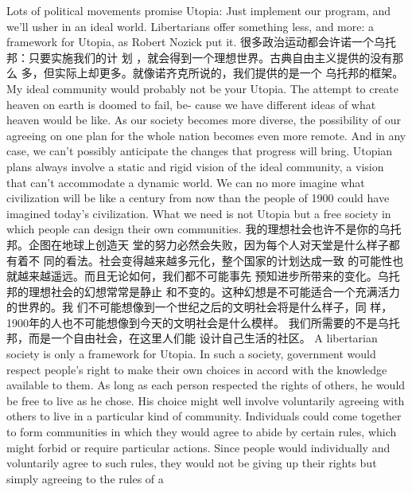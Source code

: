 \begin{paracol}{2}
Lots of political movements promise Utopia: Just implement
our program, and we'll usher in an ideal world. Libertarians
offer something less, and more: a framework for Utopia, as
Robert Nozick put it.
\switchcolumn
很多政治运动都会许诺一个乌托邦：只要实施我们的计
划 ，就会得到一个理想世界。古典自由主义提供的没有那么
多，但实际上却更多。就像诺齐克所说的，我们提供的是一个
乌托邦的框架。
\switchcolumn*
My ideal community would probably not be your Utopia. The attempt to create heaven on earth is doomed to fail, be-
cause we have different ideas of what heaven would be like. As
our society becomes more diverse, the possibility of our agreeing on one plan for the whole nation becomes even more remote. And in any case, we can't possibly anticipate the changes
that progress will bring. Utopian plans always involve a static
and rigid vision of the ideal community, a vision that can't accommodate a dynamic world. We can no more imagine what
civilization will be like a century from now than the people of
1900 could have imagined today's civilization. What we need is
not Utopia but a free society in which people can design their
own communities.
\switchcolumn
我的理想社会也许不是你的乌托邦。企图在地球上创造天
堂的努力必然会失败，因为每个人对天堂是什么样子都有着不
同的看法。社会变得越来越多元化，整个国家的计划达成一致
的可能性也就越来越遥远。而且无论如何，我们都不可能事先
预知进步所带来的变化。乌托邦的理想社会的幻想常常是静止
和不变的。这种幻想是不可能适合一个充满活力的世界的。我
们不可能想像到一个世纪之后的文明社会将是什么样子，同
样，1900年的人也不可能想像到今天的文明社会是什么模样。
我们所需要的不是乌托邦，而是一个自由社会，在这里人们能
设计自己生活的社区。
\switchcolumn*
A libertarian society is only a framework for Utopia. In such a
society, government would respect people's right to make their
own choices in accord with the knowledge available to them. As
long as each person respected the rights of others, he would be
free to live as he chose. His choice might well involve voluntarily agreeing with others to live in a particular kind of community. Individuals could come together to form communities in
which they would agree to abide by certain rules, which might
forbid or require particular actions. Since people would individually and voluntarily agree to such rules, they would not be giving up their rights but simply agreeing to the rules of a

\end{paracol}
